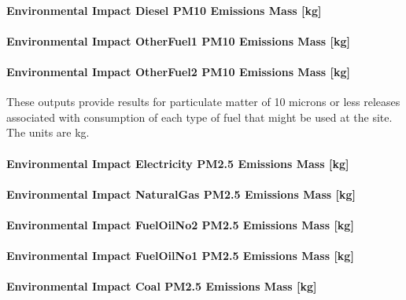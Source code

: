 \paragraph{Environmental Impact Diesel PM10 Emissions Mass {[}kg{]}}\label{environmental-impact-diesel-pm10-emissions-mass-kg}

\paragraph{Environmental Impact OtherFuel1 PM10 Emissions Mass {[}kg{]}}\label{environmental-impact-otherfuel1-pm10-emissions-mass-kg}

\paragraph{Environmental Impact OtherFuel2 PM10 Emissions Mass {[}kg{]}}\label{environmental-impact-otherfuel2-pm10-emissions-mass-kg}

These outputs provide results for particulate matter of 10 microns or less releases associated with consumption of each type of fuel that might be used at the site.~ The units are kg.

\paragraph{Environmental Impact Electricity PM2.5 Emissions Mass {[}kg{]}}\label{environmental-impact-electricity-pm2.5-emissions-mass-kg}

\paragraph{Environmental Impact NaturalGas PM2.5 Emissions Mass {[}kg{]}}\label{environmental-impact-natural-gas-pm2.5-emissions-mass-kg}

\paragraph{Environmental Impact FuelOilNo2 PM2.5 Emissions Mass {[}kg{]}}\label{environmental-impact-fuel-oil-2-pm2.5-emissions-mass-kg}

\paragraph{Environmental Impact FuelOilNo1 PM2.5 Emissions Mass {[}kg{]}}\label{environmental-impact-fuel-oil-1-pm2.5-emissions-mass-kg}

\paragraph{Environmental Impact Coal PM2.5 Emissions Mass {[}kg{]}}\label{environmental-impact-coal-pm2.5-emissions-mass-kg}

